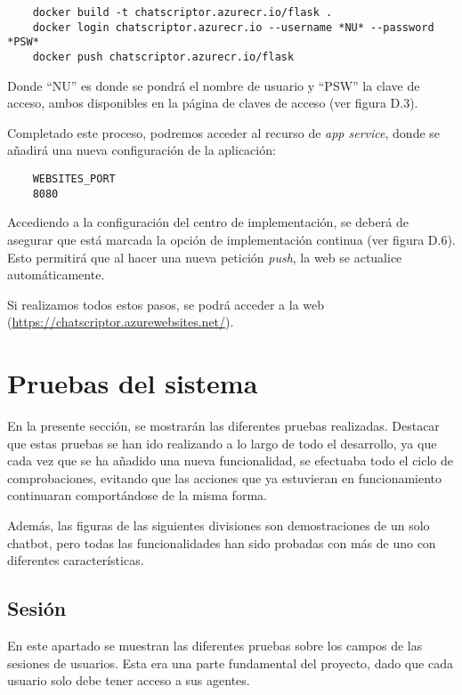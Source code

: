 \begin{verbatim}
    docker build -t chatscriptor.azurecr.io/flask .
    docker login chatscriptor.azurecr.io --username *NU* --password *PSW*
    docker push chatscriptor.azurecr.io/flask
\end{verbatim}

Donde ``NU'' es donde se pondrá el nombre de usuario y ``PSW'' la clave de acceso, ambos disponibles en la página de claves de acceso (ver figura D.3).

Completado este proceso, podremos acceder al recurso de \textit{app service}, donde se añadirá una nueva configuración de la aplicación:
\begin{verbatim}
    WEBSITES_PORT
    8080
\end{verbatim}


Accediendo a la configuración del centro de implementación, se deberá de asegurar que está marcada la opción de implementación continua (ver figura D.6). Esto permitirá que al hacer una nueva petición \textit{push}, la web se actualice automáticamente.


Si realizamos todos estos pasos, se podrá acceder a la web (\url{https://chatscriptor.azurewebsites.net/}).

\section{Pruebas del sistema}
En la presente sección, se mostrarán las diferentes pruebas realizadas. Destacar que estas pruebas se han ido realizando a lo largo de todo el desarrollo, ya que cada vez que se ha añadido una nueva funcionalidad, se efectuaba todo el ciclo de comprobaciones, evitando que las acciones que ya estuvieran en funcionamiento continuaran comportándose de la misma forma.

Además, las figuras de las siguientes divisiones son demostraciones de un solo chatbot, pero todas las funcionalidades han sido probadas con más de uno con diferentes características.

\subsection{Sesión}
En este apartado se muestran las diferentes pruebas sobre los campos de las sesiones de usuarios. Esta era una parte fundamental del proyecto, dado que cada usuario solo debe tener acceso a sus agentes.

